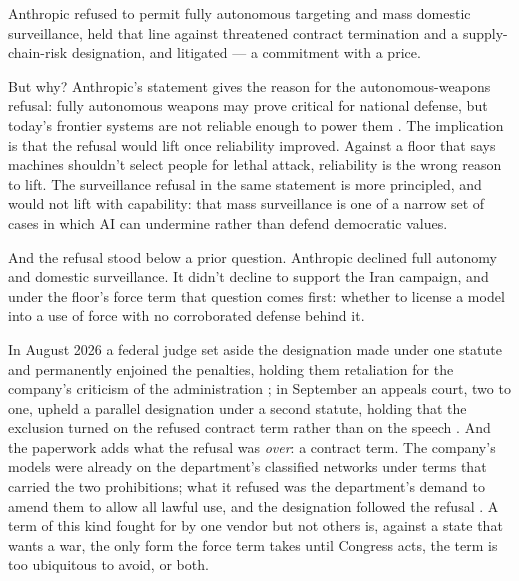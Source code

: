 
Anthropic refused to permit fully autonomous targeting and mass domestic surveillance, held that line against threatened contract termination and a supply-chain-risk designation, and litigated \autocite{crs2026pentagon} — a commitment with a price. 

But why? Anthropic's statement gives the reason for the autonomous-weapons refusal: fully autonomous weapons may prove critical for national defense, but today's frontier systems are not reliable enough to power them \autocite{Amodei2026DoWStatement}. The implication is that the refusal would lift once reliability improved. Against a floor that says machines shouldn't select people for lethal attack, reliability is the wrong reason to lift. The surveillance refusal in the same statement is more principled, and would not lift with capability: that mass surveillance is one of a narrow set of cases in which AI can undermine rather than defend democratic values.

And the refusal stood below a prior question. Anthropic declined full autonomy and domestic surveillance. It didn't decline to support the Iran campaign, and under the floor's force term that question comes first: whether to license a model into a use of force with no corroborated defense behind it.

In August 2026 a federal judge set aside the designation made under one statute and permanently enjoined the penalties, holding them retaliation for the company's criticism of the administration \autocite{anthropic2026dow}; in September an appeals court, two to one, upheld a parallel designation under a second statute, holding that the exclusion turned on the refused contract term rather than on the speech \autocite{anthropic2026dowdccir}. And the paperwork adds what the refusal was \emph{over}: a contract term. The company's models were already on the department's classified networks under terms that carried the two prohibitions; what it refused was the department's demand to amend them to allow all lawful use, and the designation followed the refusal \autocite{cnn2026phaseout,defenseone2026ultimatum,volokh2026anthropiccontract}. A term of this kind fought for by one vendor but not others is, against a state that wants a war, the only form the force term takes until Congress acts, the term is too ubiquitous to avoid, or both.
